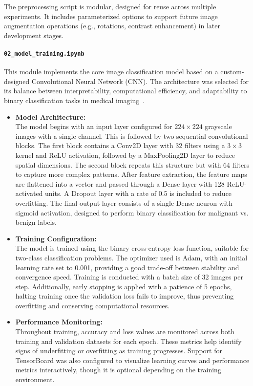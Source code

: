 \documentclass[12pt]{article}
\begin{document}
The preprocessing script is modular, designed for reuse across multiple experiments. It includes parameterized options to support future image augmentation operations (e.g., rotations, contrast enhancement) in later development stages.

\vspace{0.5em}

\paragraph{\texttt{02\_model\_training.ipynb}}
This module implements the core image classification model based on a custom-designed Convolutional Neural Network (CNN). The architecture was selected for its balance between interpretability, computational efficiency, and adaptability to binary classification tasks in medical imaging~\cite{17}.

\begin{itemize}
    \item \textbf{Model Architecture:} \\
    The model begins with an input layer configured for $224 \times 224$ grayscale images with a single channel. This is followed by two sequential convolutional blocks. The first block contains a Conv2D layer with 32 filters using a $3 \times 3$ kernel and ReLU activation, followed by a MaxPooling2D layer to reduce spatial dimensions. The second block repeats this structure but with 64 filters to capture more complex patterns. After feature extraction, the feature maps are flattened into a vector and passed through a Dense layer with 128 ReLU-activated units. A Dropout layer with a rate of 0.5 is included to reduce overfitting. The final output layer consists of a single Dense neuron with sigmoid activation, designed to perform binary classification for malignant vs. benign labels.
    
    \item \textbf{Training Configuration:} \\
    The model is trained using the binary cross-entropy loss function, suitable for two-class classification problems. The optimizer used is Adam, with an initial learning rate set to 0.001, providing a good trade-off between stability and convergence speed. Training is conducted with a batch size of 32 images per step. Additionally, early stopping is applied with a patience of 5 epochs, halting training once the validation loss fails to improve, thus preventing overfitting and conserving computational resources.
    
    \item \textbf{Performance Monitoring:} \\
    Throughout training, accuracy and loss values are monitored across both training and validation datasets for each epoch. These metrics help identify signs of underfitting or overfitting as training progresses. Support for TensorBoard was also configured to visualize learning curves and performance metrics interactively, though it is optional depending on the training environment.
\end{itemize}
\end{document}
